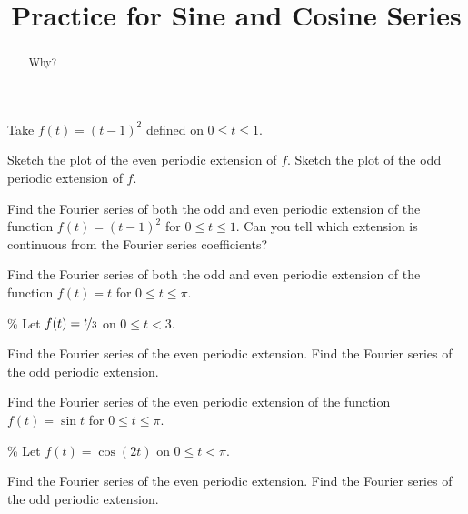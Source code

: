 \documentclass{ximera}
\title{Practice for Sine and Cosine Series}
\begin{document}
\begin{abstract}
Why?
\end{abstract}
\maketitle


\begin{exercise}
    Take $f(t) = {(t-1)}^2$ defined on $0 \leq t \leq 1$.
    \begin{tasks}
        \task Sketch the plot of the even periodic extension of $f$.
        \task Sketch the plot of the odd periodic extension of $f$.
    \end{tasks}
\end{exercise}

\begin{exercise}
    Find the Fourier series of both the odd and even periodic extension of the function $f(t) = {(t-1)}^2$ for $0 \leq t \leq 1$. Can you tell which extension is continuous from the Fourier series coefficients?
\end{exercise}

\begin{exercise}
    Find the Fourier series of both the odd and even periodic extension of the function $f(t) = t$ for $0 \leq t \leq \pi$.
\end{exercise}

\begin{exercise}\%
    Let $f(t) = \nicefrac{t}{3}$ on $0 \leq t < 3$.
    \begin{tasks}
        \task Find the Fourier series of the even periodic extension.
        \task Find the Fourier series of the odd periodic extension.
    \end{tasks}
\end{exercise}

\begin{exercise}
    Find the Fourier series of the even periodic extension of the function $f(t) = \sin t$ for $0 \leq t \leq \pi$.
\end{exercise}

\begin{exercise}\%
    Let $f(t) = \cos(2t)$ on $0 \leq t < \pi$.
    \begin{tasks}
        \task Find the Fourier series of the even periodic extension.
        \task Find the Fourier series of the odd periodic extension.
    \end{tasks}
\end{exercise}
\end{document}
